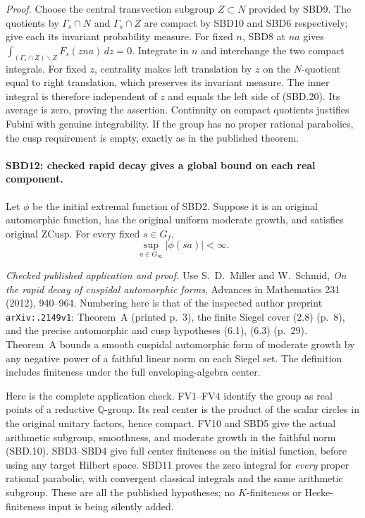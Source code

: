 \emph{Proof.}
Choose the central transvection subgroup \(Z\subset N\)
provided by SBD9.  The quotients by \(\Gamma_s\cap N\) and
\(\Gamma_s\cap Z\) are compact by SBD10 and SBD6 respectively;
give each its invariant probability measure.  For fixed \(n\),
SBD8 at \(na\) gives
\(\int_{(\Gamma_s\cap Z)\backslash Z}F_s(zna)\,dz=0\).
Integrate in \(n\) and interchange the two compact integrals.
For fixed \(z\), centrality makes left translation by \(z\)
on the \(N\)-quotient equal to right translation, which
preserves its invariant measure.  The inner integral is
therefore independent of \(z\) and equals the left side of
(SBD.20).  Its average is zero, proving the assertion.
Continuity on compact quotients justifies Fubini with genuine
integrability.  If the group has no proper rational parabolics,
the cusp requirement is empty, exactly as in the published
theorem.

\paragraph{SBD12: checked rapid decay gives a global bound on each real component.}
\label{claim:SBD12}
Let \(\phi\) be the initial extremal function of SBD2.  Suppose
it is an original automorphic function, has the original
uniform moderate growth, and satisfies original \(\mathrm{ZCusp}\).
For every fixed \(s\in G_f\),
\[
                   \sup_{a\in G_\infty}|\phi(sa)|<\infty.
 \tag{SBD.21}
\]

\emph{Checked published application and proof.}
Use S.~D.~Miller and W.~Schmid, \emph{On the rapid decay of
cuspidal automorphic forms}, Advances in Mathematics 231 (2012),
940--964.  Numbering here is that of the inspected author
preprint \texttt{ar\allowbreak Xiv:.\allowbreak 2149v1}: Theorem~A (printed p.~3),
the finite Siegel cover (2.8) (p.~8), and the precise
automorphic and cusp hypotheses (6.1), (6.3) (p.~29).
Theorem~A bounds a smooth cuspidal automorphic form of moderate
growth by any negative power of a faithful linear norm on each
Siegel set.  The definition includes finiteness under the full
enveloping-algebra center.

Here is the complete application check.  FV1--FV4 identify the
group as real points of a reductive \(\mathbb Q\)-group.  Its
real center is the product of the scalar circles in the original
unitary factors, hence compact.  FV10 and SBD5 give the actual
arithmetic subgroup, smoothness, and moderate growth in the
faithful norm (SBD.10).  SBD3--SBD4 give full center finiteness
on the initial function, before using any target Hilbert space.
SBD11 proves the zero integral for \emph{every} proper rational
parabolic, with convergent classical integrals and the same
arithmetic subgroup.  These are all the published hypotheses;
no \(K\)-finiteness or Hecke-finiteness input is being silently
added.

